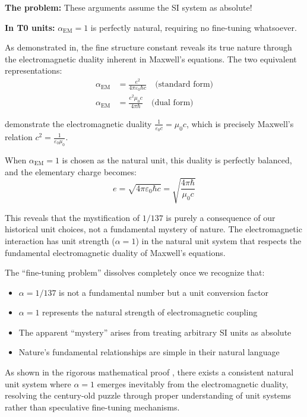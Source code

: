 \documentclass[12pt,a4paper]{article}
\begin{document}
	\textbf{The problem:} These arguments assume the SI system as absolute!
	
	\textbf{In T0 units:} $\alpha_{\text{EM}} = 1$ is perfectly natural, requiring no fine-tuning whatsoever.
	
	As demonstrated in\cite{pascher_feinstruktur_2025}, the fine structure constant reveals its true nature through the electromagnetic duality inherent in Maxwell's equations. The two equivalent representations:
	\begin{align}
		\alpha_{\text{EM}} &= \frac{e^2}{4\pi\varepsilon_0\hbar c} \quad \text{(standard form)}\\
		\alpha_{\text{EM}} &= \frac{e^2 \mu_0 c}{4\pi \hbar} \quad \text{(dual form)}
	\end{align}
	
	demonstrate the electromagnetic duality $\frac{1}{\varepsilon_0 c} = \mu_0 c$, which is precisely Maxwell's relation $c^2 = \frac{1}{\varepsilon_0\mu_0}$.
	
	When $\alpha_{\text{EM}} = 1$ is chosen as the natural unit, this duality is perfectly balanced, and the elementary charge becomes:
	$$e = \sqrt{4\pi\varepsilon_0\hbar c} = \sqrt{\frac{4\pi\hbar}{\mu_0 c}}$$
	
	This reveals that the mystification of $1/137$ is purely a consequence of our historical unit choices, not a fundamental mystery of nature. The electromagnetic interaction has unit strength ($\alpha = 1$) in the natural unit system that respects the fundamental electromagnetic duality of Maxwell's equations.
	
	The ``fine-tuning problem'' dissolves completely once we recognize that:
	\begin{itemize}
		\item $\alpha = 1/137$ is not a fundamental number but a unit conversion factor
		\item $\alpha = 1$ represents the natural strength of electromagnetic coupling
		\item The apparent ``mystery'' arises from treating arbitrary SI units as absolute
		\item Nature's fundamental relationships are simple in their natural language
	\end{itemize}
	
	As shown in the rigorous mathematical proof \cite{pascher_proof_2025}, there exists a consistent natural unit system where $\alpha = 1$ emerges inevitably from the electromagnetic duality, resolving the century-old puzzle through proper understanding of unit systems rather than speculative fine-tuning mechanisms.
	
\end{document}
